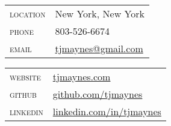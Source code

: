 \vspace{0.1in}
\begin{multicols}{2}
  \setlength{\parskip}{0pt}
  \begin{tabularx}{\linewidth}{@{}l X@{}}
    \textsc{location}    &\small{New York, New York}\\
    \textsc{phone}       &\small{803-526-6674}\\
    \textsc{email}       &\href{mailto:tjmaynes@gmail.com}{tjmaynes@gmail.com}\\
  \end{tabularx}

  \columnbreak

  \begin{tabularx}{\linewidth}{@{}l X@{}}
    \textsc{website}     &\href{https://www.tjmaynes.com}{tjmaynes.com}\\
    \textsc{github}      &\href{https://www.github.com/tjmaynes}{github.com/tjmaynes}\\
    \textsc{linkedin}    &\href{https://www.linkedin.com/in/tjmaynes}{linkedin.com/in/tjmaynes}\\
  \end{tabularx}
\end{multicols}
